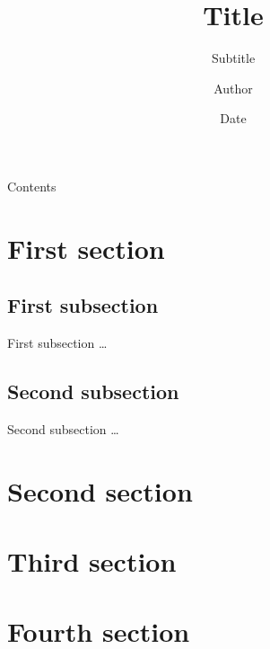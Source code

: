 \documentclass[11pt]{beamer}
\title[Short title]{Title}
\subtitle[Short subtitle]{Subtitle}
\author[Short Author]{Author}
\date[Short date]{Date}
\institute[Short Institute]{Institute}
\begin{document}
\begin{frame}
  \titlepage{}
\end{frame}
\begin{frame}{Contents}
  \tableofcontents
\end{frame}
\section{First section}
\subsection{First subsection}
\begin{frame}{First subsection}
  \dots
\end{frame}

\subsection{Second subsection}
\begin{frame}{Second subsection}
  \dots
\end{frame}

\section{Second section}
\section{Third section}
\section{Fourth section}
\end{document}
